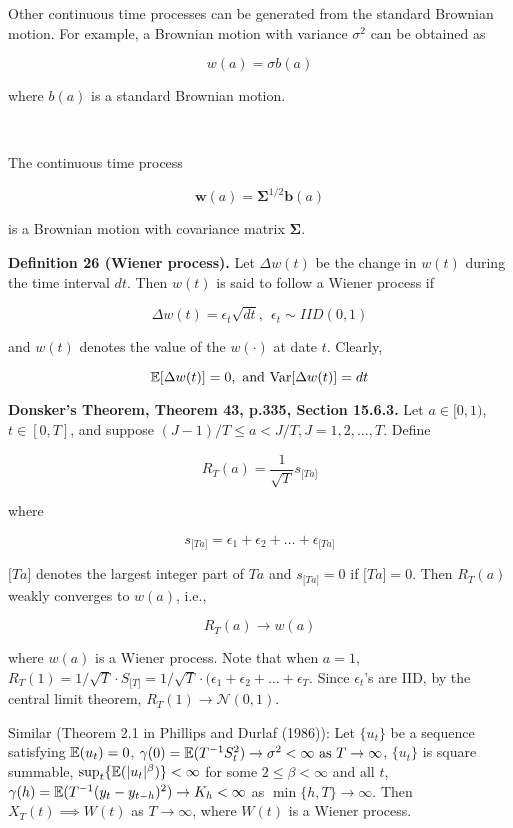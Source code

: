 Other continuous time processes can be generated from the standard Brownian motion. For example, a Brownian motion with variance \(\sigma^2\) can be obtained as

\[
w(a) = \sigma b(a)
\]

where \(b(a)\) is a standard Brownian motion.

\

The continuous time process

\[
\boldsymbol{w}(a) = \boldsymbol{\Sigma}^{1/2} \boldsymbol{b}(a)
\]

is a Brownian motion with covariance matrix \(\boldsymbol{\Sigma}\).

\textbf{Definition 26 (Wiener process).} Let \(\Delta w(t)\) be the change in \(w(t)\) during the time interval \(dt\). Then \(w(t)\) is said to follow a Wiener process if

\[
\Delta w(t) = \epsilon_t \sqrt{dt}, \ \ \epsilon_t \sim IID(0, 1)
\]

and \(w(t)\) denotes the value of the \(w(\cdot)\) at date \(t\). Clearly,

\[
\E[\Delta w(t)] = 0, \text{ and } \Var[ \Delta w(t)] = dt
\]

\textbf{Donsker's Theorem, Theorem 43, p.335, Section 15.6.3.} Let \(a \in [0, 1)\), \(t \in [0, T]\), and suppose \((J - 1)/T \leq a < J/T, J = 1, 2, \ldots, T\). Define

\[
R_T(a) = \frac{1}{\sqrt{T}} s_{ \big[Ta \big] }
\]

where

\[
s_{ \big[Ta \big] } = \epsilon_1 + \epsilon_2 + \ldots + \epsilon_{ \big[Ta \big] }
\]

\(\big[Ta \big]\) denotes the largest integer part of \(Ta\) and \(s_{ \big[Ta \big] } = 0\) if \(\big[Ta \big] = 0\). Then \(R_T(a)\) weakly converges to \(w(a)\), i.e., 

\[
R_T(a) \to w(a)
\]

where \(w(a)\) is a Wiener process. Note that when \(a = 1\), \(R_T(1) = 1/\sqrt{T} \cdot S_{\big[T \big]} = 1/\sqrt{T} \cdot (\epsilon_1 + \epsilon_2 + \ldots + \epsilon_T\). Since \(\epsilon_t\)'s are IID, by the central limit theorem, \(R_T(1) \to \mathcal{N}(0, 1)\). 

Similar (Theorem 2.1 in  Phillips and Durlaf (1986)): Let \(\{u_t\}\) be a sequence satisfying \(\E(u_t) = 0\), \( \gamma(0) = \E(T^{-1}S_t ^2) \to \sigma^2 < \infty \text{ as } T \to \infty\), \(\{u_t\}\) is square summable, \(\sup_t \{ \E( |u_t|^\beta) \} < \infty\) for some \(2 \leq \beta < \infty\) and all \(t\), \(\gamma(h) = \E(T^{-1}(y_t - y_{t-h})^2) \to K_h < \infty\) as \(\min \{h, T\} \to \infty\). Then \(X_T(t) \implies W(t)\) as \(T \to \infty\), where \(W(t)\) is a Wiener process.

